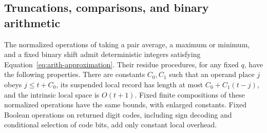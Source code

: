 \subsection{Truncations, comparisons, and binary arithmetic}

\begin{lemma}
\label{lem:arith-elementary}
The normalized operations of taking a pair average, a maximum or
minimum, and a fixed binary shift admit deterministic integers
satisfying Equation~\eqref{eq:arith-approximation}.  Their residue
procedures, for any fixed $q$, have the following properties.  There
are constants $C_0,C_1$ such that an operand place $j$ obeys
$j\leq t+C_0$, its suspended local record has length at most
$C_0+C_1(t-j)$, and the intrinsic local space is $O(t+1)$.
Fixed finite compositions of these normalized operations have the
same bounds, with enlarged constants.  Fixed Boolean operations on
returned digit codes, including sign decoding and conditional selection
of code bits, add only constant local overhead.
\end{lemma}

